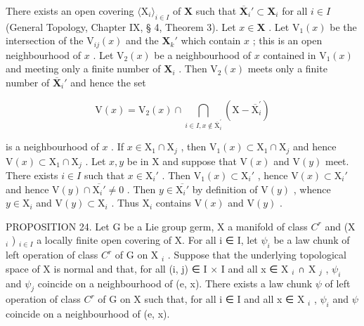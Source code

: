 There exists an open covering \(\langle \mathrm{X}_i\rangle_{i\in I}\) of \(\mathbf{X}\) such that \(\overline{\mathbf{X}}_i' \subset \mathbf{X}_i\) for all \(i \in I\) (General Topology, Chapter IX, § 4, Theorem 3). Let \(x \in \mathbf{X}\) . Let \(\mathrm{V}_1(x)\) be the intersection of the \(\mathrm{V}_{ij}(x)\) and the \(\mathbf{X}_k'\) which contain \(x\) ; this is an open neighbourhood of \(x\) . Let \(\mathrm{V}_2(x)\) be a neighbourhood of \(x\) contained in \(\mathrm{V}_1(x)\) and meeting only a finite number of \(\mathbf{X}_i\) . Then \(\mathrm{V}_2(x)\) meets only a finite number of \(\overline{\mathbf{X}}_i'\) and hence the set

\[
\mathrm{V} (x) = \mathrm{V} _ {2} (x) \cap \bigcap_ {i \in I, x \notin \overline {{\mathrm{X}}} _ {i} ^ {\prime}} (\mathrm{X} - \overline {{\mathrm{X}}} _ {i} ^ {\prime})
\]

is a neighbourhood of \(x\) . If \(x \in \mathrm{X}_1 \cap \mathrm{X}_j\) , then \(\mathrm{V}_1(x) \subset \mathrm{X}_1 \cap \mathrm{X}_j\) and hence \(\mathrm{V}(x) \subset \mathrm{X}_1 \cap \mathrm{X}_j\) . Let \(x, y\) be in \(\mathrm{X}\) and suppose that \(\mathrm{V}(x)\) and \(\mathrm{V}(y)\) meet. There exists \(i \in I\) such that \(x \in \mathrm{X}_i'\) . Then \(\mathrm{V}_1(x) \subset \mathrm{X}_i'\) , hence \(\mathrm{V}(x) \subset \mathrm{X}_i'\) and hence \(\mathrm{V}(y) \cap \overline{\mathrm{X}_i'} \neq 0\) . Then \(y \in \overline{\mathrm{X}_i'}\) by definition of \(\mathrm{V}(y)\) , whence \(y \in \mathrm{X}_i\) and \(\mathrm{V}(y) \subset \mathrm{X}_i\) . Thus \(\mathrm{X}_i\) contains \(\mathrm{V}(x)\) and \(\mathrm{V}(y)\) .

PROPOSITION 24. Let G be a Lie group germ, X a manifold of class \(C^{r}\) and (X \(_{i}\) ) \(_{i \in I}\) a locally finite open covering of X. For all i ∈ I, let \(\psi_{i}\) be a law chunk of left operation of class \(C^{r}\) of G on X \(_{i}\) . Suppose that the underlying topological space of X is normal and that, for all (i, j) ∈ I × I and all x ∈ X \(_{i}\) ∩ X \(_{j}\) , \(\psi_{i}\) and \(\psi_{j}\) coincide on a neighbourhood of (e, x). There exists a law chunk \(\psi\) of left operation of class \(C^{r}\) of G on X such that, for all i ∈ I and all x ∈ X \(_{i}\) , \(\psi_{i}\) and \(\psi\) coincide on a neighbourhood of (e, x).

